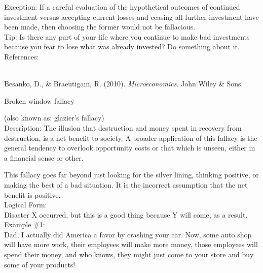 \documentclass[a4paper,12pt,single,pdftex]{scrartcl}
\begin{document}
    
      Exception: If a careful evaluation of the hypothetical outcomes of continued investment versus accepting current losses and ceasing all further investment have been made, then choosing the former would not be fallacious.
    \\

    
      Tip: Is there any part of your life where you continue to make bad investments because you fear to lose what was already invested? Do something about it.
    \\

    References:

    
      
        
      \\

      
        
          Besanko, D., \& Braeutigam, R. (2010). {\it Microeconomics}. John Wiley \& Sons.
        
      
    
  

Broken window fallacy
    
      (also known as: glazier's fallacy)
    \\

  
    Description: The illusion that destruction and money spent in recovery from destruction, is a net-benefit to society.  A broader application of this fallacy is the general tendency to overlook opportunity costs or that which is unseen, either in a financial sense or other.

    
      This fallacy goes far beyond just looking for the silver lining, thinking positive, or making the best of a bad situation.  It is the incorrect assumption that the net benefit is positive.
    \\

    
      Logical Form:
    \\

    
      Disaster X occurred, but this is a good thing because Y will come, as a result.
    \\

    
      Example \#1:
    \\

    
      Dad, I actually did America a favor by crashing your car.  Now, some auto shop will have more work, their employees will make more money, those employees will spend their money, and who knows, they might just come to your store and buy some of your products!
    \\
\end{document}
